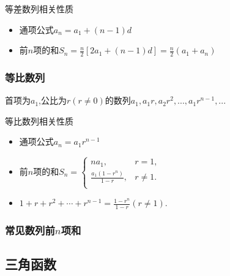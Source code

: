 \documentclass[12pt, a4paper, oneside, UTF8]{ctexbook}  %
\begin{document}
\begin{criterion}{等差数列相关性质}{}
    \begin{itemize}
        \item 通项公式$a_n=a_1+(n-1)d$
        \item 前$n$项的和$S_n=\frac{n}{2}[2a_1+(n-1)d]=\frac{n}{2}(a_1+a_n)$
    \end{itemize}
\end{criterion}

\subsubsection{等比数列}
首项为$a_1$,公比为$r(r \neq 0)$的数列$a_1,a_1r,a_2r^2,...,a_1r^{n-1},...$
\begin{criterion}{等比数列相关性质}{}
    \begin{itemize}
        \item 通项公式$a_n=a_1r^{n-1}$
        \item 前$n$项的和$S_{n}=\left\{\begin{matrix}{na_{1},}&{r=1,}\\{\frac{a_{1}\left(1-r^{n}\right)}{1-r},}&{r\neq1.}\\\end{matrix}\right.$
        \item $1+r+r^2+\cdots+r^{n-1}=\frac{1-r^n}{1-r}(r\neq1).$
    \end{itemize}
\end{criterion}
\subsubsection{常见数列前$n$项和}
\begin{center}
\end{center}

\subsection{三角函数}
\end{document}
